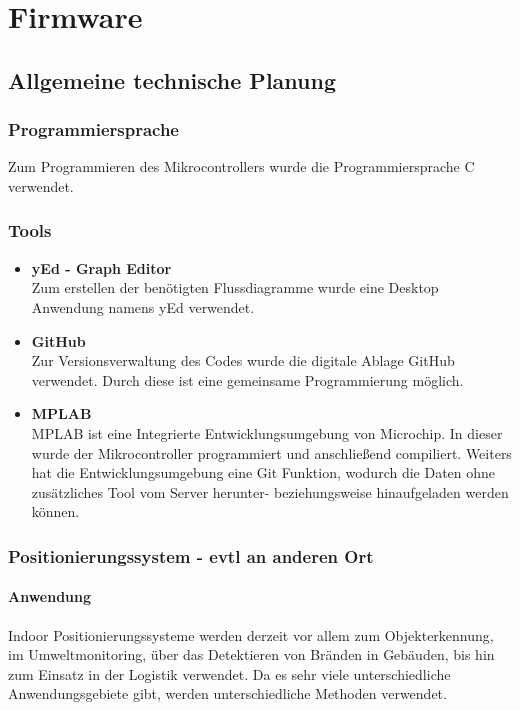 \chapter{Firmware}
\renewcommand{\kapitelautor}{Autor: Christina Bornberg, Lucas Ullrich}

\section{Allgemeine technische Planung}

  \subsection{Programmiersprache}
  Zum Programmieren des Mikrocontrollers wurde die Programmiersprache C verwendet.

  \subsection{Tools}

    \begin{itemize}
      \item \textbf{yEd - Graph Editor}\\
      Zum erstellen der benötigten Flussdiagramme wurde eine Desktop Anwendung namens yEd verwendet.  
      \item \textbf{GitHub}\\
      Zur Versionsverwaltung des Codes wurde die digitale Ablage GitHub verwendet. Durch diese ist eine gemeinsame Programmierung möglich.
      \item \textbf{MPLAB}\\
      MPLAB ist eine Integrierte Entwicklungsumgebung von Microchip. In dieser wurde der Mikrocontroller programmiert und anschließend compiliert.
      Weiters hat die Entwicklungsumgebung eine Git Funktion, wodurch die Daten ohne zusätzliches Tool vom Server herunter- beziehungsweise hinaufgeladen werden können. 
    \end{itemize}


  \subsection{Positionierungssystem - evtl an anderen Ort}

    \subsubsection{Anwendung}
    Indoor Positionierungssysteme werden derzeit vor allem zum Objekterkennung, im Umweltmonitoring, über das Detektieren von Bränden in Gebäuden, bis hin zum Einsatz in der Logistik verwendet. Da es sehr viele unterschiedliche Anwendungsgebiete gibt, werden unterschiedliche Methoden verwendet. 


